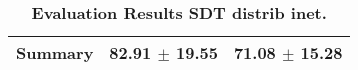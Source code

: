 \begin{table}[htb]
{\begin{tabular}{lll}
\midrule
\textbf{Summary                                  } &                  \phantom{0}82.91 $\pm$ 19.55 &                      \phantom{0}71.08 $\pm$ 15.28 \\
\bottomrule
\end{tabular}%
}
\caption{\textbf{Evaluation Results SDT distrib inet.}}
\label{tab:eval-results}
\end{table}
